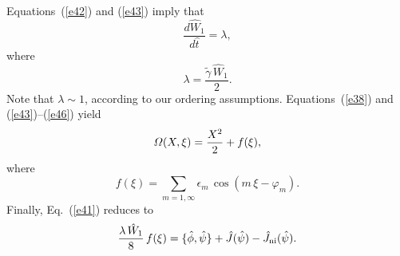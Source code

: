 \documentclass[12pt,prb,aps]{revtex4-1}
\begin{document}
Equations~(\ref{e42}) and (\ref{e43}) imply that
\begin{equation}\label{e47}
\frac{d\hat{W}_1}{d\hat{t}} = \lambda,
\end{equation}
where 
\begin{equation}
\lambda = \frac{\tilde{\gamma}\,\hat{W}_1}{2}.
\end{equation}
Note that $\lambda\sim 1$, according to our ordering assumptions. Equations~(\ref{e38}) and (\ref{e43})--(\ref{e46})
yield
\begin{equation}\label{e50}
{\mit\Omega}(X,\xi) = \frac{X^2}{2}+f(\xi),
\end{equation}
where
\begin{equation}
f(\xi) = \sum_{m=1,\infty} \epsilon_m\,\cos(m\,\xi-\varphi_m).
\end{equation}
Finally, Eq.~(\ref{e41}) reduces to 
\begin{equation}\label{e51}
\frac{\lambda\,\hat{W}_1}{8}\,f(\xi)= \{\skew{3}\hat{\phi},\hat{\psi}\}+\hat{J}(\hat{\psi})-\hat{J}_{\rm ni}(\hat{\psi}).
\end{equation}
\end{document}
